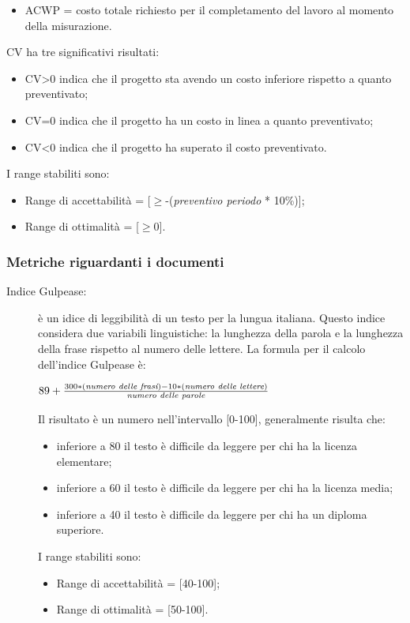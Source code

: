 \begin{description}
\begin{itemize}
        \item ACWP = costo totale richiesto per il completamento del lavoro al momento della misurazione.
      \end{itemize}
      CV ha tre significativi risultati:
      \begin{itemize}
        \item CV>0 indica che il progetto sta avendo un costo inferiore rispetto a quanto preventivato;
        \item CV=0 indica che il progetto ha un costo in linea a quanto preventivato;
        \item CV<0 indica che il progetto ha superato il costo preventivato.
      \end{itemize}
      I range stabiliti sono:
      \begin{itemize}
        \item Range di accettabilità = [\(\geq\)-(\emph{preventivo periodo} * 10\%)];
        \item Range di ottimalità = [\(\geq\)0].
      \end{itemize}
    \end{description}
    \subsubsection{Metriche riguardanti i documenti}
    \begin{description}
      \item[Indice Gulpease:] è un idice di leggibilità di un testo per la lungua italiana.
      Questo indice considera due variabili linguistiche: la lunghezza della parola e la lunghezza della frase rispetto al numero delle lettere.
      La formula per il calcolo dell'indice Gulpease è:
      \begin{center}
        \( 89+\frac{300 * (\emph{numero delle frasi}) - 10 * (\emph{numero delle lettere})}{\emph{numero delle parole}} \)
      \end{center}
      Il risultato è un numero nell'intervallo [0-100], generalmente risulta che:
      \begin{itemize}
        \item inferiore a 80 il testo è difficile da leggere per chi ha la licenza elementare;
        \item inferiore a 60 il testo è difficile da leggere per chi ha la licenza media;
        \item inferiore a 40 il testo è difficile da leggere per chi ha un diploma superiore.
      \end{itemize}
      I range stabiliti sono:
      \begin{itemize}
        \item Range di accettabilità = [40-100];
        \item Range di ottimalità = [50-100].
      \end{itemize}
    \end{description}
